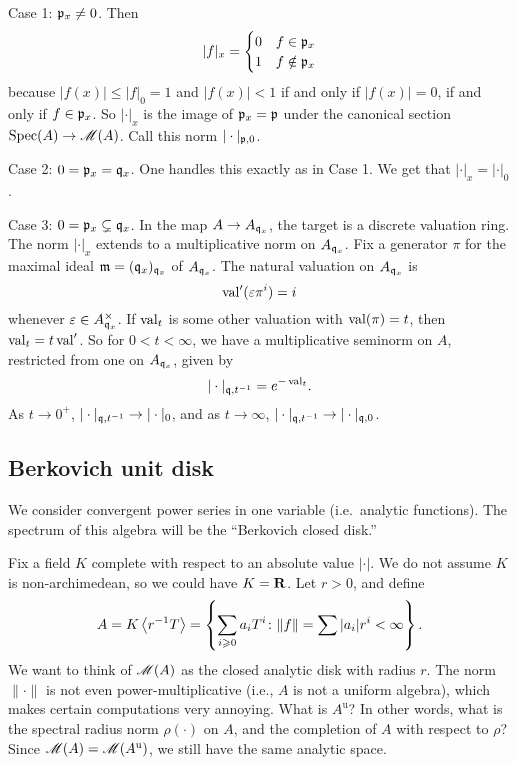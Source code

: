 Case 1: $\mathfrak{p}_x\ne 0$. Then
\[
	|f| _x= \begin{cases} 0 & f\in \mathfrak{p}_x \\ 1 & f\notin \mathfrak{p}_x \end{cases}
\]
because $|f(x)| \leqslant |f|_0 = 1$ and $|f(x)|<1$ if and only if $|f(x)|=0$, 
if and only if $f\in \mathfrak{p}_x$. So $|\cdot|_x$ is the image of $\mathfrak{p}_x=\mathfrak{p}$ under 
the canonical section $\operatorname{Spec}(A)\to \operatorname{\mathscr{M}}(A)$. Call this norm 
$|\cdot|_{\mathfrak{p},0}$. 

Case 2: $0=\mathfrak{p}_x= \mathfrak{q}_x$. One handles this exactly as in Case 1. We get that 
$|\cdot|_x=|\cdot|_0$. 

Case 3: $0=\mathfrak{p}_x\subsetneq \mathfrak{q}_x$. In the map $A\to A_{\mathfrak{q}_x}$, the target is 
a discrete valuation ring. The norm $|\cdot|_x$ extends to a multiplicative 
norm on $A_{\mathfrak{q}_x}$. Fix a generator $\pi$ for the maximal ideal 
$\mathfrak{m}=(\mathfrak{q}_x)_{\mathfrak{q}_x}$ of $A_{\mathfrak{q}_x}$. The natural valuation on $A_{\mathfrak{q}_x}$ is 
\[
	\operatorname{val}'(\varepsilon \pi^i) = i 
\]
whenever $\varepsilon\in A_{\mathfrak{q}_x}^\times$. If $\operatorname{val}_t$ is some other 
valuation with $\operatorname{val}(\pi)=t$, then $\operatorname{val}_t=t\operatorname{val}'$. So for 
$0<t<\infty$, we have a multiplicative seminorm on $A$, restricted from one on 
$A_{\mathfrak{q}_x}$, given by 
\[
	|\cdot|_{\mathfrak{q},t^{-1}} = e^{-\operatorname{val}_t} .
\]
As $t\to 0^+$, $|\cdot|_{\mathfrak{q},t^{-1}}\to |\cdot|_0$, and as $t\to \infty$, 
$|\cdot|_{\mathfrak{q},t^{-1}} \to |\cdot|_{\mathfrak{q},0}$. 





\subsection{Berkovich unit disk}

We consider convergent power series in one variable (i.e.~analytic functions). 
The spectrum of this algebra will be the ``Berkovich closed disk.''

Fix a field $K$ complete with respect to an absolute value $|\cdot|$. We do not 
assume $K$ is non-archimedean, so we could have $K=\mathbf{R}$. Let $r>0$, and define 
\[
	A = K\left\langle r^{-1} T \right\rangle = \left\{\sum_{i\geqslant 0} a_i T^i\colon \|f\| = \sum |a_i| r^i < \infty \right\} .
\]
We want to think of $\operatorname{\mathscr{M}}(A)$ as the closed analytic disk with radius $r$. 
The norm $\|\cdot\|$ is not even power-multiplicative (i.e., $A$ is not a 
uniform algebra), which makes certain computations very annoying. What is 
$A^\mathrm{u}$? In other words, what is the spectral radius norm $\rho(\cdot)$ 
on $A$, and the completion of $A$ with respect to $\rho$? Since 
$\operatorname{\mathscr{M}}(A)=\operatorname{\mathscr{M}}(A^\mathrm{u})$, we still have the same analytic 
space. 

